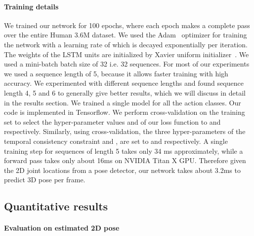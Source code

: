 \documentclass[runningheads]{llncs}
\begin{document}
\paragraph{Training details} 
We trained our network for 100 epochs, where each epoch makes a complete pass over the entire Human 3.6M dataset. We used the Adam~\cite{adam} optimizer for training the network with a learning rate of  which is decayed exponentially per iteration. The weights of the LSTM units are initialized by Xavier uniform initializer~\cite{glorot2010understanding}. We used a mini-batch batch size of 32 i.e. 32 sequences. For most of our experiments we used a sequence length of 5, because it allows faster training with high accuracy. We experimented with different sequence lengths and found sequence length 4, 5 and 6 to generally give better results, which we will discuss in detail in the results section. We trained a single model for all the action classes. Our code is implemented in Tensorflow. We perform cross-validation on the training set to select the hyper-parameter values  and  of our loss function to  and  respectively. Similarly, using cross-validation, the three hyper-parameters of the temporal consistency constraint  and , are set to  and  respectively. A single training step for sequences of length 5 takes only 34 ms approximately, while a forward pass takes only about 16ms on NVIDIA Titan X GPU. Therefore given the 2D joint locations from a pose detector, our network takes about 3.2ms to predict 3D pose per frame.

\subsection{Quantitative results}
\paragraph{Evaluation on estimated 2D pose}
\end{document}

